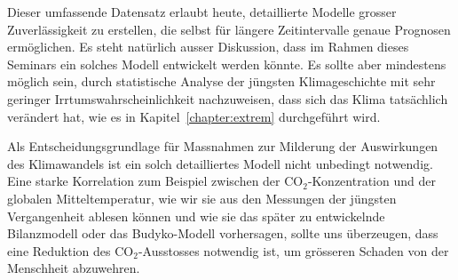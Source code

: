 Dieser umfassende Datensatz erlaubt heute, detaillierte Modelle
grosser Zuverlässigkeit zu erstellen, die selbst für längere Zeitintervalle
genaue Prognosen ermöglichen.
Es steht natürlich ausser Diskussion, dass im Rahmen dieses Seminars
ein solches Modell entwickelt werden könnte.
Es sollte aber mindestens möglich sein, durch statistische Analyse der
jüngsten Klimageschichte mit sehr geringer Irrtumswahrscheinlichkeit
nachzuweisen, dass sich das Klima tatsächlich verändert hat, wie es
in Kapitel~\ref{chapter:extrem} durchgeführt wird.

Als Entscheidungsgrundlage für Massnahmen zur Milderung der Auswirkungen
des Klimawandels ist ein solch detailliertes Modell nicht unbedingt notwendig.
Eine starke Korrelation zum Beispiel zwischen der $\text{CO}_2$-Konzentration
und der globalen Mitteltemperatur, wie wir sie aus den Messungen der
jüngsten Vergangenheit ablesen können und wie sie das später zu entwickelnde
Bilanzmodell oder das Budyko-Modell vorhersagen, sollte uns überzeugen,
dass eine Reduktion des $\text{CO}_2$-Ausstosses notwendig ist, um grösseren
Schaden von der Menschheit abzuwehren.







